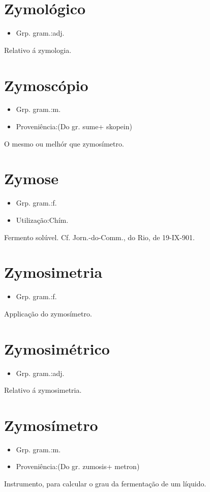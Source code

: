 \section{Zymológico}
\begin{itemize}
\item {Grp. gram.:adj.}
\end{itemize}
Relativo á zymologia.
\section{Zymoscópio}
\begin{itemize}
\item {Grp. gram.:m.}
\end{itemize}
\begin{itemize}
\item {Proveniência:(Do gr. \textunderscore sume\textunderscore  + \textunderscore skopein\textunderscore )}
\end{itemize}
O mesmo ou melhór que \textunderscore zymosímetro.\textunderscore 
\section{Zymose}
\begin{itemize}
\item {Grp. gram.:f.}
\end{itemize}
\begin{itemize}
\item {Utilização:Chím.}
\end{itemize}
Fermento solúvel. Cf. \textunderscore Jorn.-do-Comm.\textunderscore , do Rio, de 19-IX-901.
\section{Zymosimetria}
\begin{itemize}
\item {Grp. gram.:f.}
\end{itemize}
Applicação do zymosímetro.
\section{Zymosimétrico}
\begin{itemize}
\item {Grp. gram.:adj.}
\end{itemize}
Relativo á zymosimetria.
\section{Zymosímetro}
\begin{itemize}
\item {Grp. gram.:m.}
\end{itemize}
\begin{itemize}
\item {Proveniência:(Do gr. \textunderscore zumosis\textunderscore  + \textunderscore metron\textunderscore )}
\end{itemize}
Instrumento, para calcular o grau da fermentação de um líquido.
